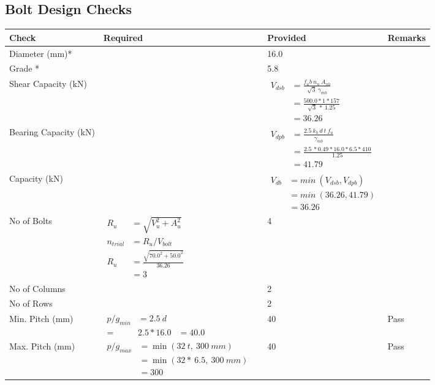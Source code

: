 \documentclass{article}%
\begin{document}
\subsection{Bolt Design Checks}%
\label{subsec:BoltDesignChecks}%
\renewcommand{\arraystretch}{1.2}%
\begin{longtable}{|p{4cm}|p{5cm}|p{5.5cm}|p{1.5cm}|}%
\hline%
\rowcolor{OsdagGreen}%
Check&Required&Provided&Remarks\\%
\hline%
\endhead%
\hline%
Diameter (mm)*&&16.0&\\%
\hline%
Grade *&&5.8&\\%
\hline%
Shear Capacity (kN)&&$\begin{aligned}V_{dsb} &= \frac{f_ub ~n_n~ A_{nb}}{\sqrt{3} ~\gamma_{mb}}\\ &= \frac{500.0*1*157}{\sqrt{3}~*~1.25}\\ &= 36.26\end{aligned}$&\\%
\hline%
Bearing Capacity (kN)&&$\begin{aligned}V_{dpb} &= \frac{2.5~ k_b~ d~ t~ f_u}{\gamma_{mb}}\\ &= \frac{2.5~*0.49*16.0*6.5*410}{1.25}\\ &=41.79\end{aligned}$&\\%
\hline%
Capacity (kN)&&$\begin{aligned}V_{db} &= min~ (V_{dsb}, V_{dpb})\\ &= min~ (36.26,41.79)\\ &=36.26\end{aligned}$&\\%
\hline%
No of Bolts&$\begin{aligned}R_{u} &= \sqrt{V_u^2+A_u^2}\\ n_{trial} &= R_u/ V_{bolt}\\ R_{u} &= \frac{\sqrt{70.0^2+50.0^2}}{36.26}\\ &=3\end{aligned}$&4&\\%
\hline%
No of Columns&&2&\\%
\hline%
No of Rows&&2&\\%
\hline%
Min. Pitch (mm)&$\begin{aligned}p/g_{min}&= 2.5 ~ d&\\ =&2.5*16.0&=40.0\end{aligned}$&40&Pass\\%
\hline%
Max. Pitch (mm)&$\begin{aligned}p/g_{max} &=\min(32~t,~300~mm)&\\ &=\min(32 *~6.5,~ 300 ~mm)\\&=300\end{aligned}$&40&Pass\\%

\end{longtable}
\end{document}
